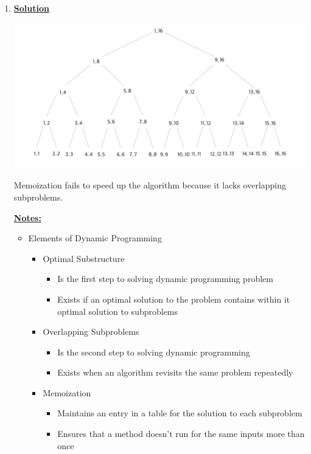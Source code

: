 \documentclass[12pt]{article}
\begin{document}
\begin{enumerate}[1.]
    \item

    \underline{\textbf{Solution}}

    \bigskip

    \begin{center}
    \includegraphics[width=\linewidth]{images/worksheet_3_solution_11.png}
    \end{center}

    Memoization fails to speed up the algorithm because it lacks overlapping subproblems.

    \bigskip

    \underline{\textbf{Notes:}}

    \bigskip

    \begin{itemize}
        \item Elements of Dynamic Programming
        \begin{itemize}
            \item Optimal Substructure
            \begin{itemize}
                \item Is the first step to solving dynamic programming problem
                \item Exists if an optimal solution to the problem contains within it optimal
                solution to subproblems
            \end{itemize}
            \item Overlapping Subproblems

            \begin{itemize}
                \item Is the second step to solving dynamic programming
                \item Exists when an algorithm revisits the same problem repeatedly
            \end{itemize}
            \item Memoization
            \begin{itemize}
                \item Maintains an entry in a table for the solution to each subproblem
                \item Ensures that a method doesn't run for the same inputs more than once
            \end{itemize}
        \end{itemize}


\end{itemize}
\end{enumerate}
\end{document}

